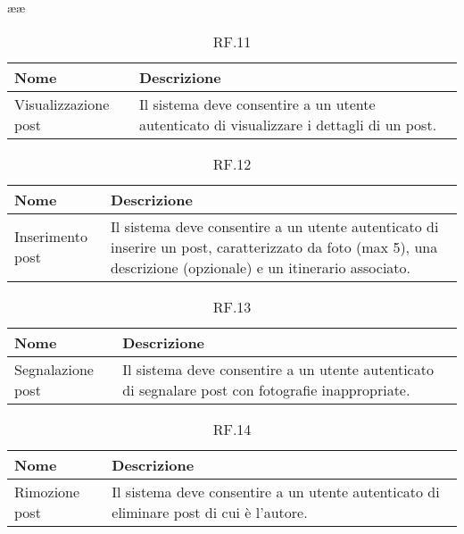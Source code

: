 ææ\documentclass{natourDoc}
\begin{document}
	\begin{table}[H]
		\centering
		\begin{tabular}{ |p{5cm}|p{10.3cm}| }
			\hline
			\rowcolor{PineGreen!70}
			\textbf{Nome} & \textbf{Descrizione} \\
			\hline
			Visualizzazione post & Il sistema deve consentire a un utente autenticato di visualizzare
			i dettagli di un post. \\
			\hline
		\end{tabular}
		\caption{RF.11}
		\label{table:11}
	\end{table}

	\begin{table}[H]
		\centering
		\begin{tabular}{ |p{5cm}|p{10.3cm}| } 
			\hline
			\rowcolor{PineGreen!70}
			\textbf{Nome} & \textbf{Descrizione} \\
			\hline
			Inserimento post &  Il sistema deve consentire a un utente autenticato di inserire un post, 
			caratterizzato da foto (max 5), una descrizione (opzionale) e un itinerario associato. \\
			\hline
		\end{tabular}
		\caption{RF.12}
		\label{table:12}
	\end{table}
	
	
	\begin{table}[H]
		\centering
		\begin{tabular}{ |p{5cm}|p{10.3cm}| }
			\hline
			\rowcolor{PineGreen!70}
			\textbf{Nome} & \textbf{Descrizione} \\
			\hline
			Segnalazione post & Il sistema deve consentire a un utente autenticato di segnalare post con fotografie
			inappropriate. \\
			\hline
		\end{tabular}
		\caption{RF.13}
		\label{table:13}
	\end{table}

	\begin{table}[H]
		\centering
		\begin{tabular}{ |p{5cm}|p{10.3cm}| }
			\hline
			\rowcolor{PineGreen!70}
			\textbf{Nome} & \textbf{Descrizione} \\
			\hline
			Rimozione post & Il sistema deve consentire a un utente autenticato di eliminare post di cui
			è l'autore. \\
			\hline
		\end{tabular}
		\caption{RF.14}
		\label{table:14}
	\end{table}
\end{document}
